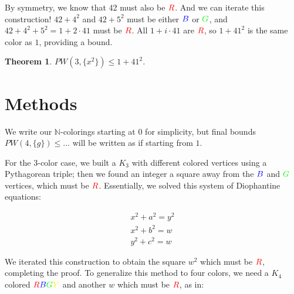 \documentclass[a4paper]{amsproc}
\theoremstyle{plain}
\newtheorem{thm}{Theorem}[section]
\theoremstyle{named}
\newcommand{\RR} {\color{red} R}
\newcommand{\BB} {\color{blue} B}
\newcommand{\GG} {\color{green} G}
\newcommand{\YY} {\color{yellow} Y}
\newcommand{\N} {\mathbb{N}}
\begin{document}
By symmetry, we know that 42 must also be $\RR$.
And we can iterate this construction! $42+4^2$ and $42+5^2$ must be either $\BB$ or $\GG$, and $42+4^2+5^2=1+2\cdot41$ must be $\RR$.
All $1+i\cdot41$ are $\RR$, so $1+41^2$ is the same color as $1$, providing a bound.

\begin{thm}
  $PW(3, \{x^2\})\leq 1+41^2$.
\end{thm}

\section{Methods}

We write our $\N$-colorings starting at $0$ for simplicity, but final bounds \\${PW(4, \{g\}) \leq \ldots}$ will be written as if starting from $1$.

For the 3-color case, we built a $K_3$ with different colored vertices using a Pythagorean triple;
then we found an integer a square away from the $\BB$ and $\GG$ vertices, which must be $\RR$.
Essentially, we solved this system of Diophantine equations:

$$
\begin{matrix}
x^2 + a^2 = y^2 \\
x^2 + b^2 = w \\
y^2 + c^2 = w
\end{matrix}
$$

We iterated this construction to obtain the square $w^2$ which must be $\RR$, completing the proof.
To generalize this method to four colors, we need a $K_4$ colored $\RR\BB\GG\YY$ and another $w$ which must be $\RR$, as in:

\begin{figure}[H]
\caption{}
\label{fig:M4}
\end{figure}
\end{document}
